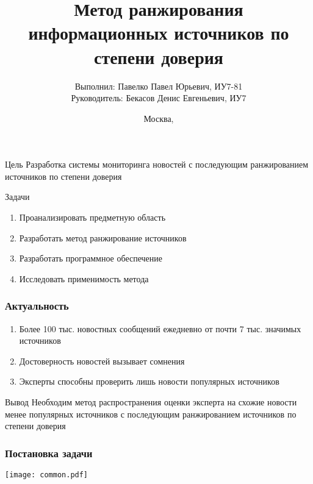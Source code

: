 \documentclass[hyperref={unicode}, 14pt, aspectratio=169]{beamer}
\title{Метод ранжирования информационных источников по степени доверия}
\author[Павелко Павел Юрьевич]{Выполнил: Павелко Павел Юрьевич, ИУ7-81 \\ Руководитель: Бекасов Денис Евгеньевич, ИУ7}
\institute[]{МГТУ им. Баумана}
\date{Москва, \the\year}
\begin{document}
\begin{frame}
  \titlepage
\end{frame}

\begin{frame}
    \begin{block}{Цель}
        Разработка системы мониторинга новостей с последующим ранжированием источников по степени доверия
    \end{block}

    \begin{block}{Задачи}
        \begin{enumerate}
            \item Проанализировать предметную область
            \item Разработать метод ранжирование источников
            \item Разработать программное обеспечение
            \item Исследовать применимость метода
        \end{enumerate}
    \end{block}
\end{frame}

\begin{frame}
    \frametitle{Актуальность}

    \begin{block}{}
        \begin{enumerate}
            \item Более 100 тыс. новостных сообщений ежедневно от почти 7 тыс. значимых источников
            \item Достоверность новостей вызывает сомнения
            \item Эксперты способны проверить лишь новости популярных источников
        \end{enumerate}
    \end{block}

    \begin{block}{Вывод}
        Необходим метод распространения оценки эксперта на схожие новости менее популярных источников с последующим ранжированием источников по степени доверия
    \end{block}
\end{frame}

\begin{frame}
    \frametitle{Постановка задачи}

    \begin{center}
        \texttt{[image: common.pdf]}
    \end{center}
\end{frame}
\end{document}
